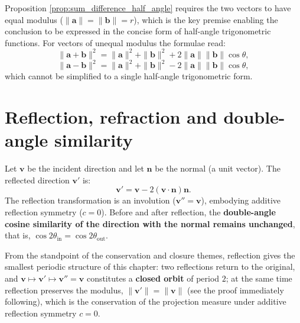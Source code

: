 \begin{remark}\label{rem:sum_difference_non_equal_length}
Proposition \ref{prop:sum_difference_half_angle} requires the two vectors to have equal modulus ($\|\mathbf{a}\| = \|\mathbf{b}\| = r$), which is the key premise enabling the conclusion to be expressed in the concise form of half-angle trigonometric functions. For vectors of unequal modulus the formulae read:
\[\|\mathbf{a} + \mathbf{b}\|^2 = \|\mathbf{a}\|^2 + \|\mathbf{b}\|^2 + 2\|\mathbf{a}\|\|\mathbf{b}\|\cos\theta,\]
\[\|\mathbf{a} - \mathbf{b}\|^2 = \|\mathbf{a}\|^2 + \|\mathbf{b}\|^2 - 2\|\mathbf{a}\|\|\mathbf{b}\|\cos\theta,\]
which cannot be simplified to a single half-angle trigonometric form.
\end{remark}

\section{\texorpdfstring{Reflection, refraction and double-angle similarity}{Reflection, refraction and double-angle similarity}}

\begin{definition}\label{def:reflection_vector}
Let $\mathbf{v}$ be the incident direction and let $\mathbf{n}$ be the normal (a unit vector). The reflected direction $\mathbf{v}'$ is:
\[\mathbf{v}' = \mathbf{v} - 2(\mathbf{v} \cdot \mathbf{n})\mathbf{n}.\]
The reflection transformation is an involution ($\mathbf{v}'' = \mathbf{v}$), embodying additive reflection symmetry ($c=0$). Before and after reflection, the \textbf{double-angle cosine similarity of the direction with the normal remains unchanged}, that is, $\cos 2\theta_{\text{in}} = \cos 2\theta_{\text{out}}$.

From the standpoint of the conservation and closure themes, reflection gives the smallest periodic structure of this chapter: two reflections return to the original, and $\mathbf{v} \mapsto \mathbf{v}' \mapsto \mathbf{v}''=\mathbf{v}$ constitutes a \textbf{closed orbit} of period $2$; at the same time reflection preserves the modulus, $\|\mathbf{v}'\| = \|\mathbf{v}\|$ (see the proof immediately following), which is the conservation of the projection measure under additive reflection symmetry $c=0$.
\end{definition}


